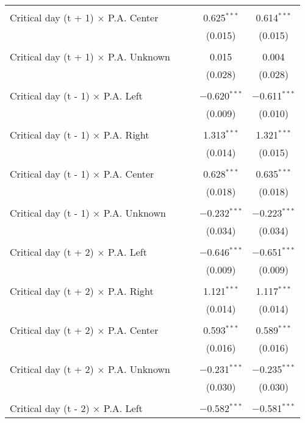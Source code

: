 \documentclass[
]{article}
\begin{document}
\begin{table}[!htbp]
{\begin{tabular}{@{\extracolsep{5pt}}lcccc}
  & & & & \\ 
 Critical day (t + 1) $\times$ P.A. Center &  &  & 0.625$^{***}$ & 0.614$^{***}$ \\ 
  &  &  & (0.015) & (0.015) \\ 
  & & & & \\ 
 Critical day (t + 1) $\times$ P.A. Unknown &  &  & 0.015 & 0.004 \\ 
  &  &  & (0.028) & (0.028) \\ 
  & & & & \\ 
 Critical day (t - 1) $\times$ P.A. Left &  &  & $-$0.620$^{***}$ & $-$0.611$^{***}$ \\ 
  &  &  & (0.009) & (0.010) \\ 
  & & & & \\ 
 Critical day (t - 1) $\times$ P.A. Right &  &  & 1.313$^{***}$ & 1.321$^{***}$ \\ 
  &  &  & (0.014) & (0.015) \\ 
  & & & & \\ 
 Critical day (t - 1) $\times$ P.A. Center &  &  & 0.628$^{***}$ & 0.635$^{***}$ \\ 
  &  &  & (0.018) & (0.018) \\ 
  & & & & \\ 
 Critical day (t - 1) $\times$ P.A. Unknown &  &  & $-$0.232$^{***}$ & $-$0.223$^{***}$ \\ 
  &  &  & (0.034) & (0.034) \\ 
  & & & & \\ 
 Critical day (t + 2) $\times$ P.A. Left &  &  & $-$0.646$^{***}$ & $-$0.651$^{***}$ \\ 
  &  &  & (0.009) & (0.009) \\ 
  & & & & \\ 
 Critical day (t + 2) $\times$ P.A. Right &  &  & 1.121$^{***}$ & 1.117$^{***}$ \\ 
  &  &  & (0.014) & (0.014) \\ 
  & & & & \\ 
 Critical day (t + 2) $\times$ P.A. Center &  &  & 0.593$^{***}$ & 0.589$^{***}$ \\ 
  &  &  & (0.016) & (0.016) \\ 
  & & & & \\ 
 Critical day (t + 2) $\times$ P.A. Unknown &  &  & $-$0.231$^{***}$ & $-$0.235$^{***}$ \\ 
  &  &  & (0.030) & (0.030) \\ 
  & & & & \\ 
 Critical day (t - 2) $\times$ P.A. Left &  &  & $-$0.582$^{***}$ & $-$0.581$^{***}$ \\ 

\end{tabular}}
\end{table}
\end{document}
